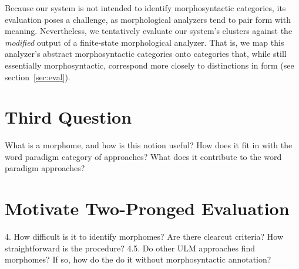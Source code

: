 Because our system is not intended to identify morphosyntactic
categories, its evaluation poses a challenge, as morphological
analyzers tend to pair form with meaning.  
Nevertheless, we
tentatively evaluate our system's clusters against the 
\emph{modified} output of a finite-state morphological analyzer. 
That is, we map this analyzer's abstract morphosyntactic categories onto
categories that, while still essentially morphosyntactic, correspond 
more closely to distinctions in form (see section~\ref{sec:eval}).


\section{Third Question}
What is a morphome, and how is this notion useful? How does it fit in with the word paradigm category of approaches? What does it contribute to the word paradigm approaches?
\section{Motivate Two-Pronged Evaluation}
4. How difficult is it to identify morphomes? Are there clearcut criteria? How straightforward is the procedure?
4.5. Do other ULM approaches find morphomes? If so, how do the do it without morphosyntactic annotation?
